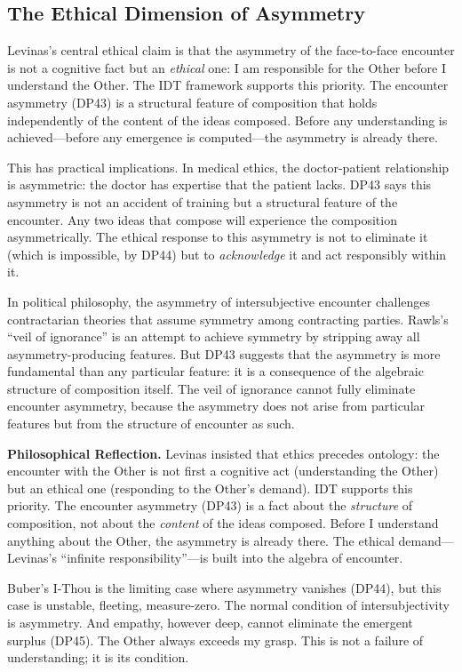 \subsection{The Ethical Dimension of Asymmetry}

Levinas's central ethical claim is that the asymmetry of the face-to-face
encounter is not a cognitive fact but an \emph{ethical} one: I am responsible
for the Other before I understand the Other.  The IDT framework supports this
priority.  The encounter asymmetry (DP43) is a structural feature of
composition that holds independently of the content of the ideas composed.
Before any understanding is achieved---before any emergence is computed---the
asymmetry is already there.

This has practical implications.  In medical ethics, the doctor-patient
relationship is asymmetric: the doctor has expertise that the patient lacks.
DP43 says this asymmetry is not an accident of training but a structural
feature of the encounter.  Any two ideas that compose will experience the
composition asymmetrically.  The ethical response to this asymmetry is not
to eliminate it (which is impossible, by DP44) but to \emph{acknowledge} it
and act responsibly within it.

In political philosophy, the asymmetry of intersubjective encounter challenges
contractarian theories that assume symmetry among contracting parties.
Rawls's ``veil of ignorance'' is an attempt to achieve symmetry by stripping
away all asymmetry-producing features.  But DP43 suggests that the asymmetry
is more fundamental than any particular feature: it is a consequence of the
algebraic structure of composition itself.  The veil of ignorance cannot fully
eliminate encounter asymmetry, because the asymmetry does not arise from
particular features but from the structure of encounter as such.

\begin{reflectionbox}
\noindent\textbf{Philosophical Reflection.}
Levinas insisted that ethics precedes ontology: the encounter with the Other
is not first a cognitive act (understanding the Other) but an ethical one
(responding to the Other's demand).  IDT supports this priority.  The encounter
asymmetry (DP43) is a fact about the \emph{structure} of composition, not
about the \emph{content} of the ideas composed.  Before I understand anything
about the Other, the asymmetry is already there.  The ethical demand---Levinas's
``infinite responsibility''---is built into the algebra of encounter.

Buber's I-Thou is the limiting case where asymmetry vanishes (DP44), but this
case is unstable, fleeting, measure-zero.  The normal condition of
intersubjectivity is asymmetry.  And empathy, however deep, cannot eliminate
the emergent surplus (DP45).  The Other always exceeds my grasp.  This is not
a failure of understanding; it is its condition.
\end{reflectionbox}

